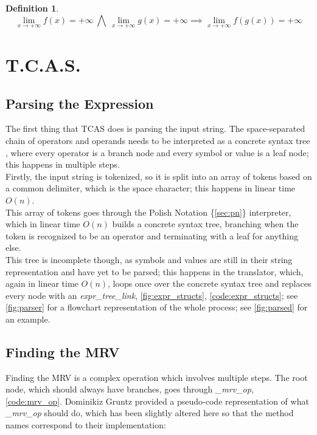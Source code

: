\documentclass{article}
\theoremstyle{plain}
\theoremstyle{definition}
\newtheorem*{defn*}{Definition}
\theoremstyle{algorithm}
\begin{document}
	\begin{defn*}
		\[
		\lim_{x \to +\infty}{f(x)}=+\infty \: \bigwedge \: \lim_{x \to +\infty}{g(x)}=+\infty \implies \lim_{x \to +\infty}{f(g(x))}=+\infty
		\]
	\end{defn*}
	
	\section{T.C.A.S.}
	
	\subsection{Parsing the Expression}
	
	The first thing that TCAS does is parsing the input string. The space-separated chain of operators and operands needs to be interpreted as a concrete syntax tree \cite{wiki:parsetree}\cite{wiki:abtree}, where every operator is a branch node and every symbol or value is a leaf node; this happens in multiple steps.\\
	Firstly, the input string is tokenized, so it is split into an array of tokens based on a common delimiter, which is the space character; this happens in linear time \(O(n)\). \\
	This array of tokens goes through the Polish Notation \{\ref{sec:pn}\} interpreter, which in linear time \(O(n)\) builds a concrete syntax tree, branching when the token is recognized to be an operator and terminating with a leaf for anything else. \\
	This tree is incomplete though, as symbols and values are still in their string representation and have yet to be parsed; this happens in the translator, which, again in linear time \(O(n)\), loops once over the concrete syntax tree and replaces every node with an \textit{expr\_tree\_link}, \cref{fig:expr_structs}, \cref{code:expr_structs}; see \cref{fig:parser} for a flowchart representation of the whole process; see \cref{fig:parsed} for an example.
	
	\subsection{Finding the MRV}
	
	Finding the MRV is a complex operation which involves multiple steps. 
	The root node, which should always have branches, goes through \textit{\_mrv\_op}, \cref{code:mrv_op}. Dominikiz Gruntz provided a pseudo-code representation of what \textit{\_mrv\_op} should do, which has been slightly altered here so that the method names correspond to their implementation:
	
\end{document}
